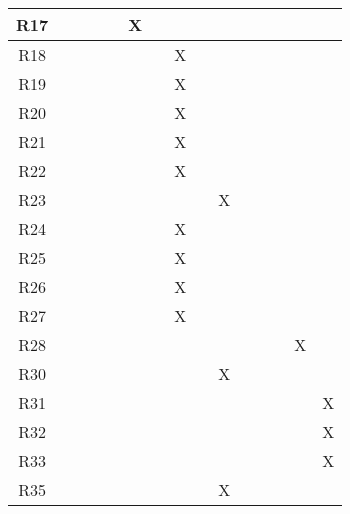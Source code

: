 \begin{table}[H]
\begin{tabular}{|c|c|c|c|c|c|c|c|c|c|c|c|c|c|c|}
R17       &    &    &    &    & X  &    &    &    &    &     &     &     &     &     \\ \hline
R18       &    &    &    &    &    &    & X  &    &    &     &     &     &     &     \\ \hline
R19       &    &    &    &    &    &    & X  &    &    &     &     &     &     &     \\ \hline
R20       &    &    &    &    &    &    & X  &    &    &     &     &     &     &     \\ \hline
R21       &    &    &    &    &    &    & X  &    &    &     &     &     &     &     \\ \hline
R22  &    &    &    &    &    &    & X  &    &    &     &     &     &     &     \\ \hline
R23       &    &    &    &    &    &    &    &    & X  &     &     &     &     &     \\ \hline
R24       &    &    &    &    &    &    & X  &    &    &     &     &     &     &     \\ \hline
R25       &    &    &    &    &    &    & X  &    &    &     &     &     &     &     \\ \hline
R26       &    &    &    &    &    &    & X  &    &    &     &     &     &     &     \\ \hline
R27       &    &    &    &    &    &    & X  &    &    &     &     &     &     &     \\ \hline
R28       &    &    &    &    &    &    &    &    &    &     &     &     & X   &     \\ \hline
R30       &    &    &    &    &    &    &    &    & X  &     &     &     &     &     \\ \hline
R31       &    &    &    &    &    &    &    &    &    &     &     &     &     & X   \\ \hline
R32       &    &    &    &    &    &    &    &    &    &     &     &     &     & X   \\ \hline
R33       &    &    &    &    &    &    &    &    &    &     &     &     &     & X   \\ \hline
R35       &    &    &    &    &    &    &    &    & X  &     &     &     &     &     \\ \hline
\end{tabular}
\end{table}
\newpage

